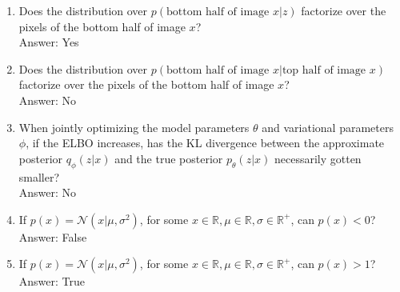 \documentclass{article}
\begin{document}
\begin{enumerate}[label=(\alph*)]
\begin{enumerate}[label=(\alph*)]
	\item Does the distribution over $p(\text{bottom half of image $x$} | z)$ factorize over the pixels of the bottom half of image $x$?
	\\ Answer: Yes
	\item Does the distribution over $p(\text{bottom half of image $x$} | \text{top half of image $x$})$ factorize over the pixels of the bottom half of image $x$?
	\\ Answer: No
	\item When jointly optimizing the model parameters $\theta$ and variational parameters $\phi$, if the ELBO increases, has the KL divergence between the approximate posterior $q_\phi(z|x)$ and the true posterior $p_\theta(z|x)$ necessarily gotten smaller?
	\\ Answer: No
	\item If $p(x) = \mathcal{N}(x | \mu, \sigma^2)$, for some $x \in \mathbb{R}, \mu \in \mathbb{R}, \sigma \in \mathbb{R}^+$, can $p(x) < 0$?
	\\ Answer: False
	\item If $p(x) = \mathcal{N}(x | \mu, \sigma^2)$, for some $x \in \mathbb{R}, \mu \in \mathbb{R}, \sigma \in \mathbb{R}^+$, can $p(x) > 1$?
	\\ Answer: True
\end{enumerate}


\end{enumerate}
\end{document}
